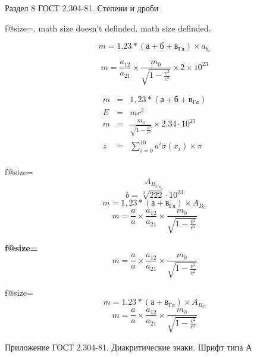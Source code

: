 \documentclass[trace=off]{article}
\begin{document}
  \newpage
  \eskdfont \eskdfontsize{7mm} \selectfont\mdseries
  Раздел 8 ГОСТ 2.304-81. Степени и дроби

  \papergraduate

  f@size=\f@size,
    {math size doesn't definded.}
    {math size definded.}

  \[m = 1.23 * \left(а+б+в_{Гл}\right)\times a_{b_c}\]

  \[m = \frac{a_{12}}{a_{21}} \times \frac{m_0}{\sqrt{1-\frac{v^2}{c^2}}}\times 2 \times 10^{23}\]

  \begin{eqnarray}
    m &=& 1,23 * \left(а+б+в_{Гл}\right)\\
    E &=& mc^2\\
    m &=& \frac{m_0}{\sqrt{1-\frac{v^2}{c^2}}}\times 2.34 \cdot 10^{23}\\
    z &=& \sum_{i=0}^{10}a^i\sigma\left( x_i \right) \times \pi\\
  \end{eqnarray}

  \newpage
  \papergraduate
  \eskdfont \eskdfontsize{14mm} \selectfont\mdseries
  f@size=\f@size
  \[A_{B_{C_{D_{E_{F}}}}}\]
  \[b=\sqrt[3]{222} \cdot 10^{23} \] %
  \[m = 1,23 * \left(а+в_{Гл}\right) \times A_{B_C}\]
  \[m = \frac{a}{a}\times\frac{a_{12}}{a_{21}} \times \frac{m_0}{\sqrt{1-\frac{v^2}{c^2}}}\]

  \eskdfont \eskdfontsize{10mm} \selectfont\bfseries
  f@size=\f@size
  \[m = \frac{a}{a}\times\frac{a_{12}}{a_{21}} \times \frac{m_0}{\sqrt{1-\frac{v^2}{c^2}}}\]

  \eskdfont \eskdfontsize{3.5mm} \selectfont\mdseries
  f@size=\f@size
  \[m = 1.23 * \left(а+в_{Гл}\right) \times A_{B_C}\]
  \[m = \frac{a}{a}\times\frac{a_{12}}{a_{21}} \times \frac{m_0}{\sqrt{1-\frac{v^2}{c^2}}}\]
  
  \newpage
  \eskdfont \eskdfontsize{7mm} \selectfont\mdseries
  Приложение ГОСТ 2.304-81. Диакритические знаки. Шрифт типа А

  {
    \eskdfontsize{14mm}
    {
    }
  }
\end{document}
